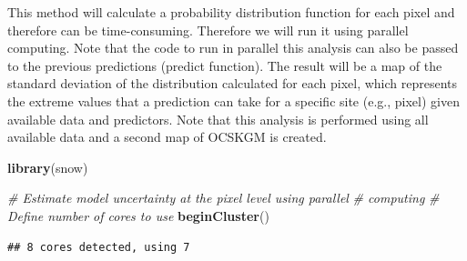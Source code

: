\documentclass[10pt,b5paper,]{book}
\newenvironment{Shaded}{\begin{snugshade}}{\end{snugshade}}
\newcommand{\CommentTok}[1]{\textcolor[rgb]{0.56,0.35,0.01}{\textit{#1}}}
\newcommand{\DataTypeTok}[1]{\textcolor[rgb]{0.13,0.29,0.53}{#1}}
\newcommand{\KeywordTok}[1]{\textcolor[rgb]{0.13,0.29,0.53}{\textbf{#1}}}
\newcommand{\NormalTok}[1]{#1}
\newcommand{\OperatorTok}[1]{\textcolor[rgb]{0.81,0.36,0.00}{\textbf{#1}}}
\newcommand{\StringTok}[1]{\textcolor[rgb]{0.31,0.60,0.02}{#1}}
\theoremstyle{definition}
\theoremstyle{definition}
\theoremstyle{definition}
\theoremstyle{remark}
\begin{document}
This method will calculate a probability distribution function for each
pixel and therefore can be time-consuming. Therefore we will run it
using parallel computing. Note that the code to run in parallel this
analysis can also be passed to the previous predictions (predict
function). The result will be a map of the standard deviation of the
distribution calculated for each pixel, which represents the extreme
values that a prediction can take for a specific site (e.g., pixel)
given available data and predictors. Note that this analysis is
performed using all available data and a second map of OCSKGM is
created.

\begin{Shaded}
\begin{Highlighting}[]
\KeywordTok{library}\NormalTok{(snow)}

\CommentTok{# Estimate model uncertainty at the pixel level using parallel }
\CommentTok{# computing}
\CommentTok{# Define number of cores to use}
\KeywordTok{beginCluster}\NormalTok{()}
\end{Highlighting}
\end{Shaded}

\begin{verbatim}
## 8 cores detected, using 7
\end{verbatim}

\begin{Shaded}
\end{Shaded}
\end{document}
